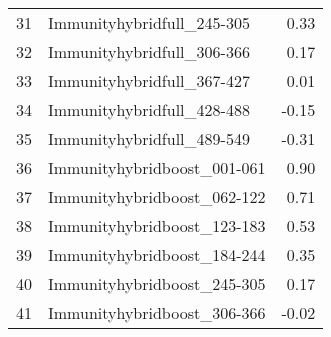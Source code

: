 \begin{table}[ht]
\begin{tabular}{rlr}
  31 & Immunityhybridfull\_245-305 & 0.33 \\ 
  32 & Immunityhybridfull\_306-366 & 0.17 \\ 
  33 & Immunityhybridfull\_367-427 & 0.01 \\ 
  34 & Immunityhybridfull\_428-488 & -0.15 \\ 
  35 & Immunityhybridfull\_489-549 & -0.31 \\ 
  36 & Immunityhybridboost\_001-061 & 0.90 \\ 
  37 & Immunityhybridboost\_062-122 & 0.71 \\ 
  38 & Immunityhybridboost\_123-183 & 0.53 \\ 
  39 & Immunityhybridboost\_184-244 & 0.35 \\ 
  40 & Immunityhybridboost\_245-305 & 0.17 \\ 
  41 & Immunityhybridboost\_306-366 & -0.02 \\ 
   \hline
\end{tabular}
\end{table}
